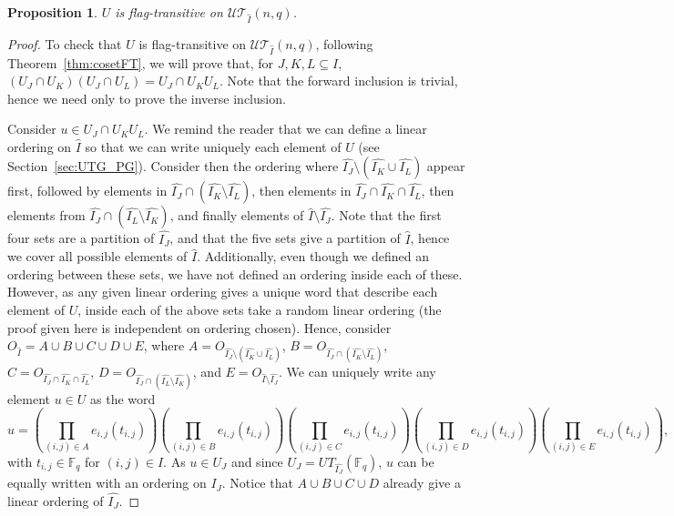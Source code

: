 \documentclass[11pt,letterpaper]{amsart}
\newtheorem{proposition}[theorem]{Proposition}
\newcommand{\TT}{\mathcal{T}}
\newcommand{\FF}{\mathbb{F}}
\newcommand{\UU}{\mathcal{U}}
\begin{document}
\begin{proposition}\label{prop:Pattern_FT}
    $U$ is flag-transitive on $\UU\TT_{\widehat{I}}(n,q)$.
\end{proposition}
\begin{proof}
    To check that $U$ is flag-transitive on $\UU\TT_{\widehat{I}}(n,q)$, following Theorem~\ref{thm:cosetFT}, we will prove that, for $J,K,L\subseteq I$, $(U_J \cap U_K)(U_J \cap U_L) = U_J\cap U_KU_L$. Note that the forward inclusion is trivial, hence we need only to prove the inverse inclusion.

    Consider $u\in U_J\cap U_K U_L$. We remind the reader that we can define a linear ordering on $\widehat{I}$ so that we can write uniquely each element of $U$ (see Section~\ref{sec:UTG_PG}). Consider then the ordering where $ \widehat{I_J}\setminus (\widehat{I_K}\cup \widehat{I_L})$ appear first, followed by elements in $\widehat{I_J} \cap (\widehat{I_K}\setminus \widehat{I_L})$, then elements in $\widehat{I_J}\cap \widehat{I_K}\cap \widehat{I_L}$, then elements from $\widehat{I_J}\cap (\widehat{I_L}\setminus \widehat{I_K})$, and finally elements of $\widehat{I}\setminus \widehat{I_J}$.
    Note that the first four sets are a partition of $\widehat{I_J}$, and that the five sets give a partition of $\widehat{I}$, hence we cover all possible elements of $\widehat{I}$.
    Additionally, even though we defined an ordering between these sets, we have not defined an ordering inside each of these. However, as any given linear ordering gives a unique word that describe each element of $U$, inside each of the above sets take a random linear ordering (the proof given here is independent on ordering chosen).
    Hence, consider $O_{\widehat{I}} = A \cup B \cup C \cup D \cup E$, where $A=O_{\widehat{I_J}\setminus(\widehat{I_K}\cup \widehat{I_L})}$, $B = O_{\widehat{I_J} \cap (\widehat{I_K}\setminus \widehat{I_L})}$, $C = O_{\widehat{I_J}\cap \widehat{I_K} \cap \widehat{I_L}}$, $D = O_{\widehat{I_J} \cap (\widehat{I_L}\setminus \widehat{I_K})}$, and $E = O_{\widehat{I}\setminus \widehat{I_J}}$.
    We can uniquely write any element $u\in U$ as the word
    $$ u = \left(\prod_{(i,j)\in A} e_{i,j}(t_{i,j}) \right) \left(\prod_{(i,j)\in B} e_{i,j}(t_{i,j}) \right) \left(\prod_{(i,j)\in C} e_{i,j}(t_{i,j}) \right) \left(\prod_{(i,j)\in D} e_{i,j}(t_{i,j}) \right) \left(\prod_{(i,j)\in E} e_{i,j}(t_{i,j}) \right),$$
    with $t_{i,j}\in \FF_q$ for $(i,j)\in \widehat{I}$.
    As $u\in U_J$ and since $U_J = UT_{\widehat{I_J}}(\FF_q)$, $u$ can be equally written with an ordering on $I_J$. Notice that $A\cup B\cup C\cup D$ already give a linear ordering of $\widehat{I_J}$.

\end{proof}
\end{document}
